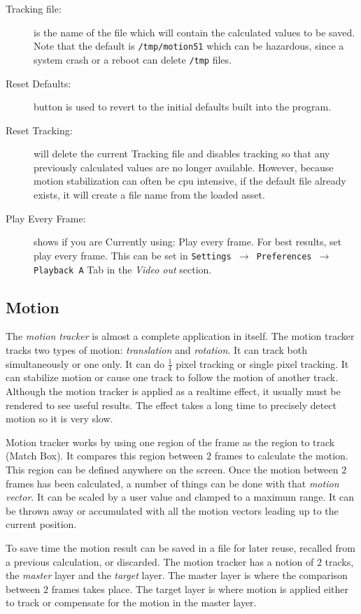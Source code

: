 \begin{description}
    \item[Tracking file:] is the name of the file which will contain the calculated values to be saved. Note that the default is \texttt{/tmp/motion51} which can be hazardous, since a system crash or a reboot can delete \texttt{/tmp} files.
    \item[Reset Defaults:] button is used to revert to the initial defaults built into the program.
    \item[Reset Tracking:] will delete the current Tracking file and disables tracking so that any previously calculated values are no longer available. However, because motion stabilization can often be cpu intensive, if the default file already exists, it will create a file name from the loaded asset.
    \item[Play Every Frame:] shows if you are Currently using: Play every frame. For best results, set play every frame. This can be set in \texttt{Settings $\rightarrow$ Preferences $\rightarrow$ Playback A} Tab in the \textit{Video out} section.
\end{description}

\subsection{Motion}%
\label{sub:motion}

The \textit{motion tracker} is almost a complete application in itself. The motion tracker tracks two types of motion: \textit{translation} and \textit{rotation}. It can track both simultaneously or one only. It can do $\frac{1}{4}$ pixel tracking or single pixel tracking. It can stabilize motion or cause one track to follow the motion of another track. Although the motion tracker is applied as a realtime effect, it usually must be rendered to see useful results. The effect takes a long time to precisely detect motion so it is very slow.

Motion tracker works by using one region of the frame as the region to track (Match Box). It compares this region between $2$ frames to calculate the motion. This region can be defined anywhere on the screen. Once the motion between $2$ frames has been calculated, a number of things can be done with that \textit{motion vector}. It can be scaled by a user value and clamped to a maximum range. It can be thrown away or accumulated with all the motion vectors leading up to the current position.

To save time the motion result can be saved in a file for later reuse, recalled from a previous calculation, or discarded. The motion tracker has a notion of $2$ tracks, the \textit{master} layer and the \textit{target} layer. The master layer is where the comparison between $2$ frames takes place. The target layer is where motion is applied either to track or compensate for the motion in the master layer.

